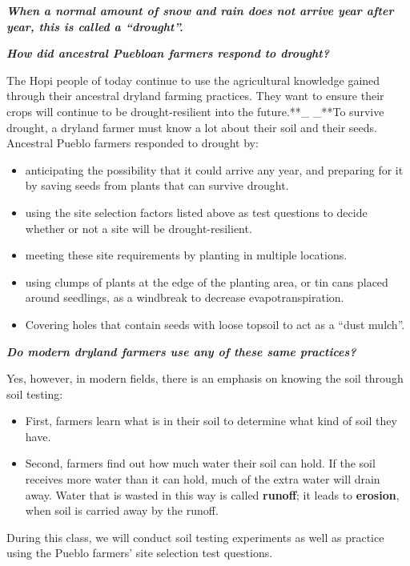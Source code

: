 \documentclass[12pt,]{article}
\providecommand{\tightlist}{%
  \setlength{\itemsep}{0pt}\setlength{\parskip}{0pt}}
\begin{document}
\textbf{\emph{When a normal amount of snow and rain does not arrive year after year, this is called a ``drought''.}}

\textbf{\emph{How did ancestral Puebloan farmers respond to drought?}}

The Hopi people of today continue to use the agricultural knowledge gained through their ancestral dryland farming practices. They want to ensure their crops will continue to be drought-resilient into the future.**\_ \_**To survive drought, a dryland farmer must know a lot about their soil and their seeds. Ancestral Pueblo farmers responded to drought by:

\begin{itemize}
\tightlist
\item
  anticipating the possibility that it could arrive any year, and preparing for it by saving seeds from plants that can survive drought.
\item
  using the site selection factors listed above as test questions to decide whether or not a site will be drought-resilient.
\item
  meeting these site requirements by planting in multiple locations.
\item
  using clumps of plants at the edge of the planting area, or tin cans placed around seedlings, as a windbreak to decrease evapotranspiration.
\item
  Covering holes that contain seeds with loose topsoil to act as a ``dust mulch''.
\end{itemize}

\textbf{\emph{Do modern dryland farmers use any of these same practices? }}

Yes, however, in modern fields, there is an emphasis on knowing the soil through soil testing:

\begin{itemize}
\tightlist
\item
  First, farmers learn what is in their soil to determine what kind of soil they have.
\item
  Second, farmers find out how much water their soil can hold. If the soil receives more water than it can hold, much of the extra water will drain away. Water that is wasted in this way is called \textbf{runoff}; it leads to \textbf{erosion}, when soil is carried away by the runoff.
\end{itemize}

During this class, we will conduct soil testing experiments as well as practice using the Pueblo farmers' site selection test questions.
\end{document}
